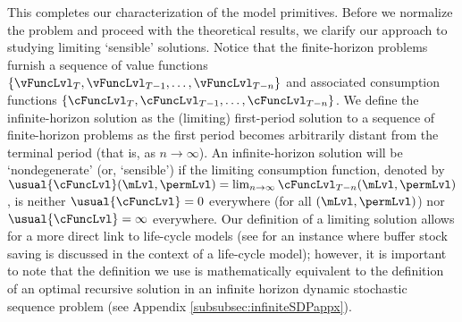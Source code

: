 \documentclass[BufferStockTheory]{subfiles}
\begin{document}
This completes our characterization of the model primitives.
Before we normalize the problem and proceed with the theoretical results, we clarify our approach to studying limiting `sensible' solutions.
Notice that the finite-horizon problems furnish a sequence of value functions $\{\vFuncLvl_{T},\vFuncLvl_{T-1},\ldots,\vFuncLvl_{T-n}\}$ and associated consumption functions $\{\cFuncLvl_{T},\cFuncLvl_{T-1},\ldots,\cFuncLvl_{T-n}\}$.
We define the infinite-horizon solution as the (limiting) first-period solution to a sequence of finite-horizon problems as the first period becomes arbitrarily distant from the terminal period (that is, as $n \rightarrow \infty$).
An infinite-horizon solution will be `nondegenerate' (or, `sensible') if the limiting consumption function, denoted by $\usual{\cFuncLvl}(\mLvl,\permLvl) = \lim_{n \rightarrow \infty} \cFuncLvl_{T-n}(\mLvl,\permLvl)$, is neither $\usual{\cFuncLvl}=0$ everywhere (for all $(\mLvl,\permLvl)$) nor $\usual{\cFuncLvl}=\infty$ everywhere.
Our definition of a limiting solution allows for a more direct link to life-cycle models (see \cite{gpLifeCycle} for an instance where buffer stock saving is discussed in the context of a life-cycle model); however, it is important to note that the definition we use is mathematically equivalent to the definition of an optimal recursive solution in an infinite horizon dynamic stochastic sequence problem (see Appendix \ref{subsubsec:infiniteSDPappx}).


\hypertarget{PDV}{}

\begin{comment}
we do not need the below?
The model looks more special than it is.
In particular, a positive probability of zero-income events may seem objectionable (despite empirical support).
However, a nonzero minimum value of $\tranShkAll$ (motivated, say, by the existence of unemployment insurance) could be handled by capitalizing the present discounted value (PDV) of minimum income into current market assets,\footnote{So long as unemployment benefits are proportional to $\permLvl_{t}$; see the discussion in Section~\ref{sec:discussConvergence}.} and transforming that model back into this one.
And no key results would change if the transitory shocks were persistent but mean-reverting (instead of iid).\@ Also, the assumption of a positive point mass for the worst realization of the transitory shock is inessential, but simplifies the proofs and is a powerful aid to intuition.
\end{comment}

\begin{comment}
Following footnotes and text were removed from the discussion above

\footnote{We calibrate this probability to 0.005 to match data from the Panel Study of Income Dynamics (\cite{carrollBrookings}).}

\footnote{\cite{rabaultBorrowing} and~\cite{lsIncFluct} analyze cases where the shock processes have unbounded support.} 

and when $\permShkIndMin=\permShkIndMax=1$ the model becomes the degenerate case with no permanent shocks
\end{comment}
\end{document}
